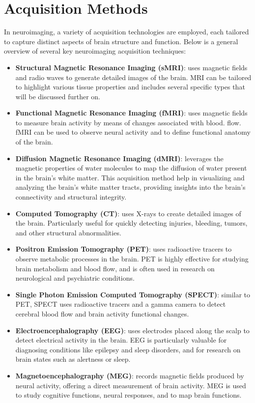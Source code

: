 \section{Acquisition Methods}
In neuroimaging, a variety of acquisition technologies are employed, each
tailored to capture distinct aspects of brain structure and function. Below is a
general overview of several key neuroimaging acquisition techniques:
\begin{itemize}
    \item \textbf{Structural Magnetic Resonance Imaging (sMRI)}: uses magnetic
    fields and radio waves to generate detailed images of the brain. MRI can be
    tailored to highlight various tissue properties and includes several
    specific types that will be discussed further on.
    \item \textbf{Functional Magnetic Resonance Imaging (fMRI)}: uses magnetic
    fields to measure brain activity by means of changes associated with blood.
    flow. fMRI can be used to observe neural activity and to define
    functional anatomy of the brain.
    \item \textbf{Diffusion Magnetic Resonance Imaging (dMRI)}: leverages the
    magnetic properties of water molecules to map the diffusion of water present
    in the brain's white matter. This acquisition method help in visualizing and
    analyzing the brain's white matter tracts, providing insights into the
    brain's connectivity and structural integrity.
    \item \textbf{Computed Tomography (CT)}: uses X-rays to create detailed
    images of the brain. Particularly useful for quickly detecting injuries,
    bleeding, tumors, and other structural abnormalities.
    \item \textbf{Positron Emission Tomography (PET)}: uses radioactive tracers
    to observe metabolic processes in the brain. PET is highly effective for
    studying brain metabolism and blood flow, and is often used in research on
    neurological and psychiatric conditions.
    \item \textbf{Single Photon Emission Computed Tomography (SPECT)}: similar
    to PET, SPECT uses radioactive tracers and a gamma camera to detect cerebral
    blood flow and brain activity functional changes.
    \item \textbf{Electroencephalography (EEG)}: uses electrodes placed along
    the scalp to detect electrical activity in the brain. EEG is particularly
    valuable for diagnosing conditions like epilepsy and sleep disorders, and
    for research on brain states such as alertness or sleep.
    \item \textbf{Magnetoencephalography (MEG)}: records magnetic fields
    produced by neural activity, offering a direct measurement of brain
    activity. MEG is used to study cognitive functions, neural responses, and to
    map brain functions.
\end{itemize}

